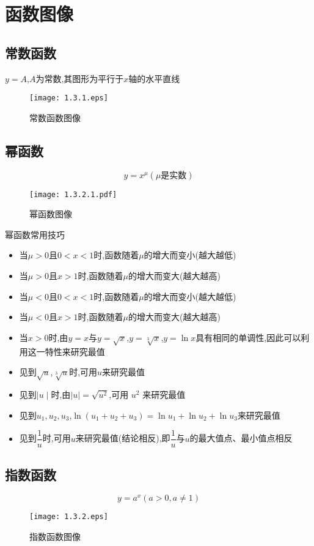 \documentclass[8pt a4paper, oneside, UTF8]{ctexbook}  %
\begin{document}
\begin{sloppypar}
    \section{函数图像}
    \subsection{常数函数}
    $y=A$,$A$为常数,其图形为平行于$x$轴的水平直线
    \begin{figure}[H]
        \centering \texttt{[image: 1.3.1.eps]} \caption{常数函数图像}
    \end{figure}
    \subsection{幂函数}
    $$
        y=x^{\mu}(\mu \text{是实数})
    $$
    \begin{figure}[H]
        \centering
        \texttt{[image: 1.3.2.1.pdf]}
        \caption{幂函数图像}
    \end{figure}
    \begin{criterion}{幂函数常用技巧}{}
        \begin{itemize}
            \item 当$\mu>0$且$0<x<1$时,函数随着$\mu$的增大而变小(越大越低)
            \item 当$\mu >0$且$x>1$时,函数随着$\mu$的增大而变大(越大越高)
            \item 当$\mu <0$且$0<x<1$时,函数随着$\mu$的增大而变小(越大越低)
            \item 当$\mu <0$且$x>1$时,函数随着$\mu$的增大而变大(越大越高)
            \item 当$x>0$时,由$y=x$与$y=\sqrt{x}$,$y=\sqrt[3]{x}$,$y=\ln x$具有相同的单调性,因此可以利用这一特性来研究最值
            \item 见到$\sqrt{u}$,$\sqrt[3]{u}$时,可用$u$来研究最值
            \item 见到$\mid u\mid$时,由$\mid u\mid=\sqrt{u^2}$,可用 $u^2$ 来研究最值
            \item 见到$u_1,u_2,u_3$,$\ln (u_1+u_2+u_3)=\ln u_{1}+\ln u_{2}+\ln u_{3}$来研究最值
            \item 见到$\dfrac{1}{u}$时,可用$u$来研究最值(结论相反),即$\dfrac{1}{u}$与$u$的最大值点、最小值点相反
        \end{itemize}
    \end{criterion}
    \subsection{指数函数}
    $$
        y=a^x (a>0,a \neq 1)
    $$
    \begin{figure}[H]
        \centering \texttt{[image: 1.3.2.eps]} \caption{指数函数图像}
    \end{figure}


\end{sloppypar}
\end{document}

